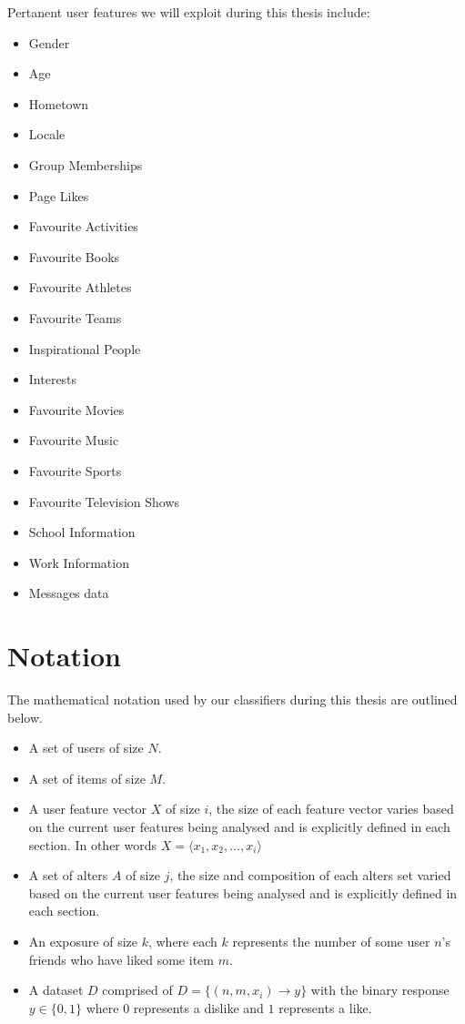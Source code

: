 Pertanent user features we will exploit during this thesis include:
\begin{itemize}
\item Gender
\item Age
\item Hometown
\item Locale
\item Group Memberships
\item Page Likes
\item Favourite Activities
\item Favourite Books
\item Favourite Athletes
\item Favourite Teams
\item Inspirational People
\item Interests
\item Favourite Movies
\item Favourite Music
\item Favourite Sports
\item Favourite Television Shows
\item School Information
\item Work Information
\item Messages data
\end{itemize}

\section{Notation}
\label{sec:notation}

The mathematical notation used by our classifiers during this thesis are outlined below.

\begin{itemize}
\item A set of users of size $N$. 
\item A set of items of size $M$.
\item A user feature vector $X$ of size $i$, the size of each feature vector varies based on the current user features being analysed
and is explicitly defined in each section. In other words $X = \langle x_1, x_2, \dots , x_i \rangle$
\item A set of alters $A$ of size $j$, the size and composition of each alters set varied based on the current user features being 
analysed and is explicitly defined in each section.
\item An exposure of size $k$, where each $k$ represents the number of some user $n$'s friends who have liked some item $m$.
\item A dataset $D$ comprised of $D = \{(n,m,x_i) \to y\}$ with the binary response $y \in \{0,1\}$ where $0$ represents a dislike 
and $1$ represents a like.
\end{itemize}

